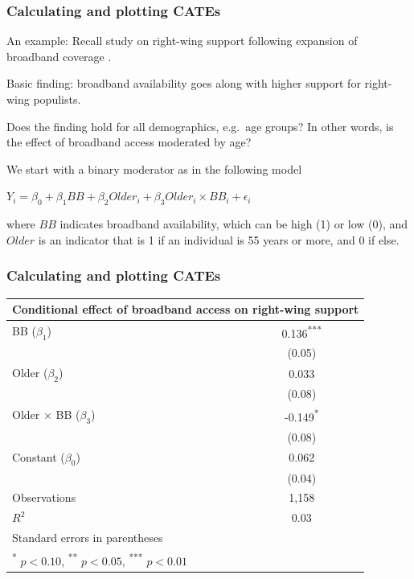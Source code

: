 \documentclass[12pt,english,dvipsnames,aspectratio=169,handout]{beamer}\usepackage[]{graphicx}\usepackage[]{xcolor}
\begin{document}
\begin{frame}
  \frametitle{Calculating and plotting CATEs}
\footnotesize

An example: Recall study on right-wing support following expansion of broadband coverage \cite{schaub_voter_2020}. 

Basic finding: broadband availability goes along with higher support for right-wing populists.

Does the finding hold for all demographics, e.g.\ age groups? In other words, is the effect of broadband access moderated by age?

We start with a binary moderator as in the following model

$Y_i = \beta_0 + \beta_1 {BB} + \beta_2 {Older}_i + \beta_3 {Older}_i \times {BB}_i + \epsilon_i$

where ${BB}$ indicates broadband availability, which can be high (1) or low (0), and ${Older}$ is an indicator that is 1 if an individual is 55 years or more, and 0 if else.

\end{frame}



\begin{frame}
  \frametitle{Calculating and plotting CATEs}
\footnotesize

\scriptsize
\centering
\begin{tabular}{l*{1}{c}}
\toprule
\multicolumn{2}{c}{Conditional effect of broadband access on right-wing support}\\
\midrule
BB ($\beta_1$)&    0.136\textsuperscript{***}\\
                &   (0.05)         \\
Older ($\beta_2$)        &    0.033         \\
                &   (0.08)         \\
Older $\times$ BB ($\beta_3$) &   -0.149\textsuperscript{*}  \\
                &   (0.08)         \\
Constant ($\beta_0$)       &    0.062         \\
                &   (0.04)         \\
\midrule
Observations    &     1,158         \\
\(R^{2}\)       &     0.03         \\
\bottomrule
\multicolumn{2}{l}{Standard errors in parentheses}\\
\multicolumn{2}{l}{\textsuperscript{*} \(p<0.10\), \textsuperscript{**} \(p<0.05\), \textsuperscript{***} \(p<0.01\)}\\
\end{tabular}

\end{frame}
\end{document}
